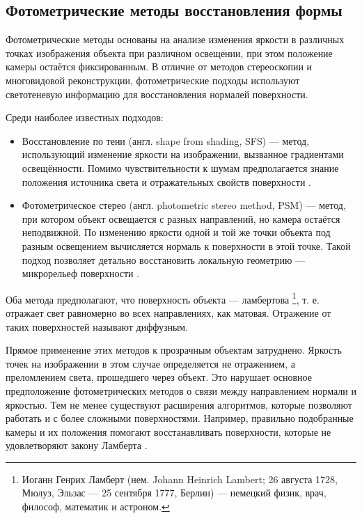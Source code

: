 \subsection{Фотометрические методы восстановления формы}

Фотометрические методы основаны на анализе изменения яркости в различных точках
изображения объекта при различном освещении, при этом положение камеры остаётся
фиксированным. В отличие от методов стереоскопии и многовидовой реконструкции,
фотометрические подходы используют светотеневую информацию для восстановления
нормалей поверхности.

Среди наиболее известных подходов:

\begin{itemize}
	\item Восстановление по тени (англ. shape from shading, SFS) —
	метод, использующий изменение яркости на изображении, вызванное градиентами
	освещённости. Помимо чувствительности к шумам предполагается знание положения источника света и
	отражательных свойств поверхности \cite{Horn1989SFS}.
	\item Фотометрическое стерео (англ. photometric stereo method, PSM) — метод, при котором
	объект освещается с разных направлений, но камера остаётся неподвижной. По
	изменению яркости одной и той же точки объекта под разным освещением
	вычисляется нормаль к поверхности в этой точке. Такой подход позволяет детально
	восстановить локальную геометрию — микрорельеф поверхности
	\cite{10.1117/12.7972479}.
\end{itemize}

Оба метода предполагают, что поверхность объекта — ламбертова \footnote{Иоганн
Генрих Ламберт (нем. Johann Heinrich Lambert; 26 августа 1728, Мюлуз, Эльзас —
25 сентября 1777, Берлин) — немецкий физик, врач, философ, математик и
астроном.}, т. е.  отражает свет равномерно во всех направлениях, как матовая.
Отражение от таких поверхностей называют диффузным.

Прямое применение этих методов к прозрачным объектам затруднено. Яркость точек
на изображении в этом случае определяется не отражением, а преломлением света,
прошедшего через объект. Это нарушает основное предположение фотометрических
методов о связи между направлением нормали и яркостью. Тем не менее существуют
расширения алгоритмов, которые позволяют работать и с более сложными поверхностями.
Например, правильно подобранные камеры и их положения помогают восстанавливать поверхности,
которые не удовлетворяют закону Ламберта \cite{McGunnigle-2012}.

